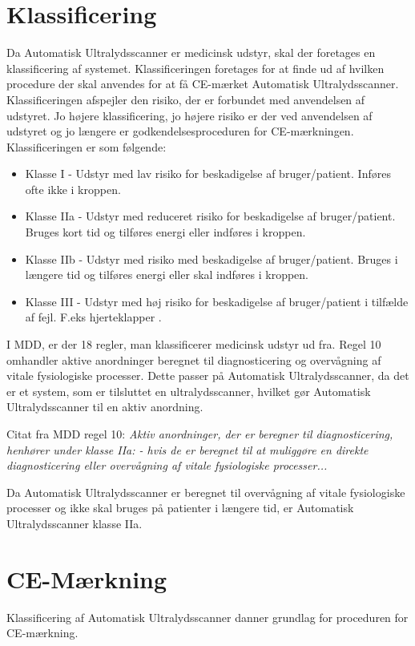 \section{Klassificering}
Da Automatisk Ultralydsscanner er medicinsk udstyr, skal der foretages en klassificering af systemet. Klassificeringen foretages for at finde ud af hvilken procedure der skal anvendes for at få CE-mærket Automatisk Ultralydsscanner. Klassificeringen afspejler den risiko, der er forbundet med anvendelsen af udstyret. Jo højere klassificering, jo højere risiko er der ved anvendelsen af udstyret og jo længere er godkendelsesproceduren for CE-mærkningen. 
Klassificeringen er som følgende: 
\let\labelitemi\labelitemii \begin{itemize}
\item Klasse I - Udstyr med lav risiko for beskadigelse af bruger/patient. Inføres ofte ikke i kroppen.
\item Klasse IIa - Udstyr med reduceret risiko for beskadigelse af bruger/patient. Bruges kort tid og tilføres energi eller indføres i kroppen.  
\item Klasse IIb -  Udstyr med risiko med beskadigelse af bruger/patient. Bruges i længere tid og tilføres energi eller skal indføres i kroppen. 
\item Klasse III - Udstyr med høj risiko for beskadigelse af bruger/patient i tilfælde af fejl. F.eks hjerteklapper \cite{Delta}. 
\end{itemize} 

I MDD, er der 18 regler, man klassificerer medicinsk udstyr ud fra. 
Regel 10 omhandler aktive anordninger beregnet til diagnosticering og overvågning af vitale fysiologiske processer. Dette passer på Automatisk Ultralydsscanner, da det er et system, som er tilsluttet en ultralydsscanner, hvilket gør Automatisk Ultralydsscanner til en aktiv anordning.  

Citat fra MDD regel 10:  
\emph{Aktiv anordninger, der er beregner til diagnosticering, henhører under klasse IIa: - hvis de er beregnet til at muliggøre en direkte diagnosticering eller overvågning af vitale fysiologiske processer...}

Da Automatisk Ultralydsscanner er beregnet til overvågning af vitale fysiologiske processer og ikke skal bruges på patienter i længere tid, er Automatisk Ultralydsscanner klasse IIa. 

\section{CE-Mærkning}
Klassificering af Automatisk Ultralydsscanner danner grundlag for proceduren for CE-mærkning. 

